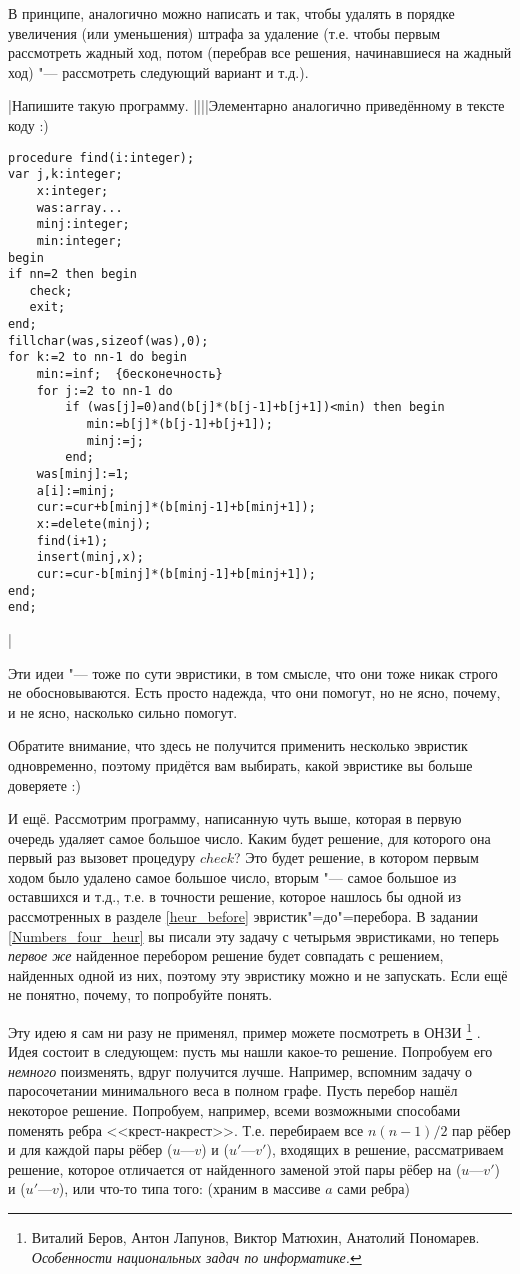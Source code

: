 В принципе, аналогично можно написать и так, чтобы удалять в порядке увеличения (или уменьшения) штрафа за удаление
(т.е. чтобы первым рассмотреть жадный ход, потом (перебрав все решения, начинавшиеся на жадный 
ход) "--- рассмотреть следующий вариант и т.д.).

\task|Напишите такую программу.
||||Элементарно аналогично приведённому в тексте коду :)
\begin{codesample}\begin{verbatim}
procedure find(i:integer);
var j,k:integer;
    x:integer;
    was:array...
    minj:integer;
    min:integer;
begin
if nn=2 then begin
   check;
   exit;
end;
fillchar(was,sizeof(was),0);
for k:=2 to nn-1 do begin
    min:=inf;  {бесконечность}
    for j:=2 to nn-1 do 
        if (was[j]=0)and(b[j]*(b[j-1]+b[j+1])<min) then begin
           min:=b[j]*(b[j-1]+b[j+1]);
           minj:=j;
        end;
    was[minj]:=1;
    a[i]:=minj;
    cur:=cur+b[minj]*(b[minj-1]+b[minj+1]);
    x:=delete(minj);
    find(i+1);
    insert(minj,x);
    cur:=cur-b[minj]*(b[minj-1]+b[minj+1]);
end;
end;
\end{verbatim}\end{codesample}
|

Эти идеи "--- тоже по сути эвристики, в том смысле, что они тоже никак строго не 
обосновываются. Есть просто надежда, что они помогут, но не ясно, почему, и не ясно, насколько сильно помогут.

Обратите внимание, что здесь не получится применить несколько эвристик одновременно, поэтому придётся вам выбирать, какой эвристике вы больше доверяете :)

И ещё. Рассмотрим программу, написанную чуть выше, которая в первую очередь удаляет самое большое число. Каким будет решение, для которого она первый раз вызовет процедуру $check$? Это будет решение, в котором первым ходом было удалено самое большое число, вторым "--- самое большое из оставшихся и т.д., т.е. в точности решение, которое нашлось бы одной из рассмотренных в разделе \ref{heur_before} эвристик"=до"=перебора. В задании \ref{Numbers_four_heur} вы писали эту задачу с четырьмя эвристиками, но теперь \textit{первое же} найденное перебором решение будет совпадать с решением, найденных одной из них, поэтому эту эвристику можно и не запускать. Если ещё не понятно, почему, то попробуйте понять.

Эту идею я сам ни разу не применял, пример можете посмотреть в ОНЗИ%
\footnote{Виталий Беров, Антон Лапунов,
Виктор Матюхин, Анатолий Пономарев. \textit{Особенности
национальных задач
по информатике.}}%
.
 Идея состоит в следующем: 
пусть мы нашли какое-то решение. Попробуем его \textit{немного} поизменять, вдруг получится лучше. 
Например, вспомним задачу о паросочетании минимального веса в полном графе. Пусть перебор 
нашёл некоторое решение. Попробуем, например, всеми возможными способами поменять ребра 
<<крест-накрест>>. Т.е. перебираем все $n(n-1)/2$ пар рёбер и для каждой пары рёбер ($u$---$v$) и ($u'$---$v'$), входящих в решение, рассматриваем 
решение, которое отличается от найденного заменой этой пары рёбер на ($u$---$v'$) и ($u'$---$v$), или что-то типа того:
(храним в массиве $a$ сами ребра)

